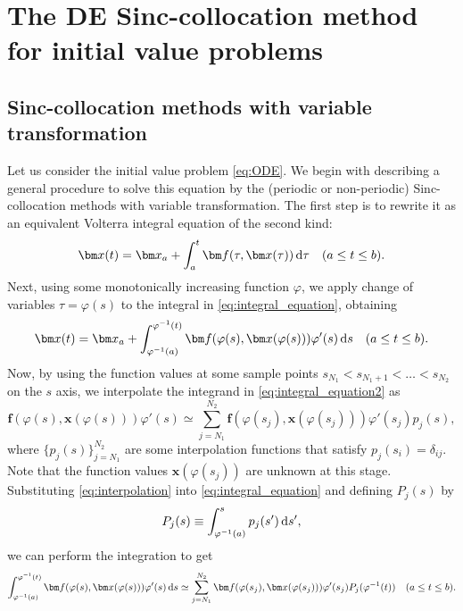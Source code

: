 \documentclass[pdflatex,sn-mathphys-num]{sn-jnl}%
\theoremstyle{thmstyleone}%
\theoremstyle{thmstyletwo}%
\theoremstyle{thmstylethree}%
\begin{document}
\section{The DE Sinc-collocation method for initial value problems}
\label{DE_Sinc}
\subsection{Sinc-collocation methods with variable transformation}
Let us consider the initial value problem \eqref{eq:ODE}. We begin with describing a general procedure to solve this equation by the (periodic or non-periodic) Sinc-collocation methods with variable transformation. The first step is to rewrite it as an equivalent Volterra integral equation of the second kind:
\begin{equation}
{\bm x}(t)={\bm x}_a+\int_a^t{\bm f}(\tau,{\bm x}(\tau))\,{\rm d}\tau \quad (a\le t\le b).
\label{eq:integral_equation}
\end{equation}
Next, using some monotonically increasing function $\varphi$, we apply change of variables $\tau=\varphi(s)$ to the integral in \eqref{eq:integral_equation}, obtaining
\begin{equation}
{\bm x}(t)={\bm x}_a+\int_{\varphi^{-1}(a)}^{\varphi^{-1}(t)}{\bm f}(\varphi(s),{\bm x}(\varphi(s)))\varphi'(s)\,{\rm d}s \quad (a\le t\le b).
\label{eq:integral_equation2}
\end{equation}
Now, by using the function values at some sample points $s_{N_1}<s_{N_1+1}<\ldots<s_{N_2}$ on the $s$ axis, we interpolate the integrand in \eqref{eq:integral_equation2} as
\begin{equation}
{\bm f}(\varphi(s),{\bm x}(\varphi(s)))\varphi'(s) \simeq \sum_{j=N_1}^{N_2} {\bm f}(\varphi(s_j),{\bm x}(\varphi(s_j)))\varphi'(s_j)p_j(s),
\label{eq:interpolation}
\end{equation}
where $\{p_j(s)\}_{j=N_1}^{N_2}$ are some interpolation functions that satisfy $p_j(s_i)=\delta_{ij}$. Note that the function values ${\bm x}(\varphi(s_j))$ are unknown at this stage. Substituting \eqref{eq:interpolation} into \eqref{eq:integral_equation} and defining $P_j(s)$ by
\begin{equation}
P_j(s) \equiv \int_{\varphi^{-1}(a)}^s p_j(s')\,{\rm d}s',
\label{eq:pintegral}
\end{equation}
we can perform the integration to get
\begin{equation}
\int_{\varphi^{-1}(a)}^{\varphi^{-1}(t)}{\bm f}(\varphi(s),{\bm x}(\varphi(s)))\varphi'(s)\,{\rm d}s \simeq \sum_{j=N_1}^{N_2}{\bm f}(\varphi(s_j), {\bm x}(\varphi(s_j)))\varphi'(s_j)P_j(\varphi^{-1}(t)) \quad (a\le t\le b).
\label{eq:integral_equation3}
\end{equation}
\end{document}
